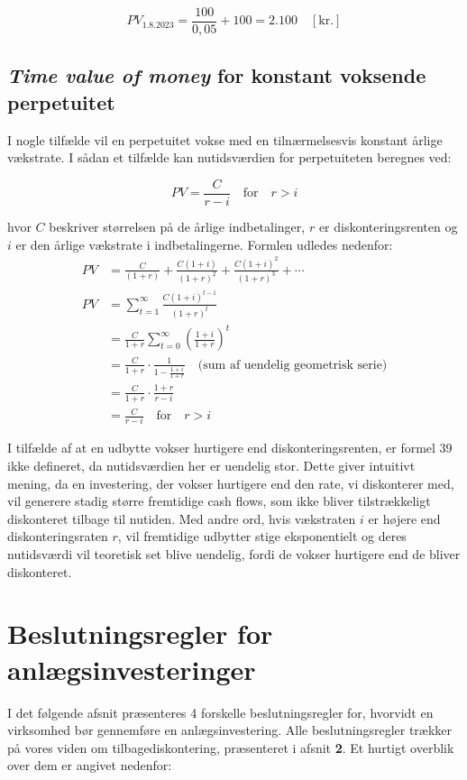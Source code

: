 \documentclass[10pt,reqno, usenames]{article}
\begin{document}
\begin{equation}
    PV_{1.8.2023} = \frac{100}{0,05} + 100 = 2.100 \quad [\text{kr.}]
\end{equation}

\subsection{\textit{Time value of money} for konstant voksende perpetuitet}
I nogle tilfælde vil en perpetuitet vokse med en tilnærmelsesvis konstant årlige vækstrate. I sådan et tilfælde kan nutidsværdien for perpetuiteten beregnes ved: 

\begin{equation}
    PV = \frac{C}{r - i} \quad \text{for} \quad r > i
\end{equation}

hvor $C$ beskriver størrelsen på de årlige indbetalinger, $r$ er diskonteringsrenten og $i$ er den årlige vækstrate i indbetalingerne. Formlen udledes nedenfor: 
\begin{align*}
PV &= \frac{C}{(1 + r)} + \frac{C(1 + i)}{(1 + r)^2} + \frac{C(1 + i)^2}{(1 + r)^3} + \cdots \\
PV &= \sum_{t=1}^{\infty} \frac{C(1 + i)^{t-1}}{(1 + r)^t} \\
&= \frac{C}{1 + r} \sum_{t=0}^{\infty} \left( \frac{1 + i}{1 + r} \right)^t \\
&= \frac{C}{1 + r} \cdot \frac{1}{1 - \frac{1 + i}{1 + r}} \quad \text{(sum af uendelig geometrisk serie)} \\
&= \frac{C}{1 + r} \cdot \frac{1 + r}{r - i} \\
&= \frac{C}{r - i} \quad \text{for} \quad r > i
\end{align*}

I tilfælde af at en udbytte vokser hurtigere end diskonteringsrenten, er formel 39 ikke defineret, da nutidsværdien her er uendelig stor. Dette giver intuitivt mening, da en investering, der vokser hurtigere end den rate, vi diskonterer med, vil generere stadig større fremtidige cash flows, som ikke bliver tilstrækkeligt diskonteret tilbage til nutiden. Med andre ord, hvis vækstraten $i$ er højere end diskonteringsraten $r$, vil fremtidige udbytter stige eksponentielt og deres nutidsværdi vil teoretisk set blive uendelig, fordi de vokser hurtigere end de bliver diskonteret.


\section{Beslutningsregler for anlægsinvesteringer}
I det følgende afsnit præsenteres 4 forskelle beslutningsregler for, hvorvidt en virksomhed bør gennemføre en anlægsinvestering. Alle beslutningsregler trækker på vores viden om tilbagediskontering, præsenteret i afsnit \textbf{2}. Et hurtigt overblik over dem er angivet nedenfor:
\end{document}
